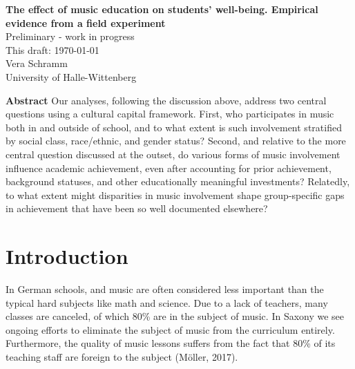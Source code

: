 \documentclass[a4, 12pt]{article}
\begin{document}
\begin{titlepage}
\thispagestyle{empty}%
\begin{center}
\renewcommand{\baselinestretch}{1.0}\normalsize %
\textbf{
The effect of music education on students' well-being. Empirical evidence from a field experiment}\\[1cm]
Preliminary - work in progress \\[1cm]
This draft: \today \\[1cm]
Vera Schramm \\
University of Halle-Wittenberg \\[0.75cm]
 \end{center}


\end{titlepage}

\setcounter{page}{2}

\renewcommand{\baselinestretch}{1}\normalsize

\textbf{\normalsize Abstract}
Our analyses, following the discussion above, address two central questions
using a cultural capital framework. First, who participates in music
both in and outside of school, and to what extent is such involvement
stratified by social class, race/ethnic, and gender status? Second, and relative
to the more central question discussed at the outset, do various forms of
music involvement influence academic achievement, even after accounting
for prior achievement, background statuses, and other educationally meaningful
investments? Relatedly, to what extent might disparities in music
involvement shape group-specific gaps in achievement that have been so well
documented elsewhere?

\clearpage
\tableofcontents

\clearpage
\listoftables

\clearpage
\listoffigures

\clearpage
\doublespacing
\pagestyle{plain}

\hypertarget{introduction}{%
\section{Introduction}\label{introduction}}

\label{introduction}

In German schools, and music are often considered less important than the typical hard subjects like math and science. Due to a lack of teachers, many classes are canceled, of which 80\% are in the subject of music. In Saxony we see ongoing efforts to eliminate the subject of music from the curriculum entirely. Furthermore, the quality of music lessons suffers from the fact that 80\% of its teaching staff are foreign to the subject (Möller, 2017).
\end{document}
